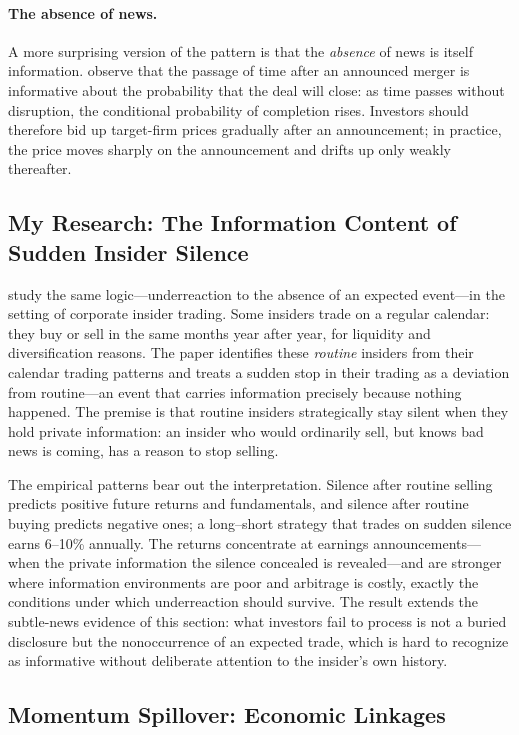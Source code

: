 \paragraph{The absence of news.} A more surprising version of the pattern is that the \emph{absence} of news is itself information. \citet{giglio2014} observe that the passage of time after an announced merger is informative about the probability that the deal will close: as time passes without disruption, the conditional probability of completion rises. Investors should therefore bid up target-firm prices gradually after an announcement; in practice, the price moves sharply on the announcement and drifts up only weakly thereafter.

\subsection{My Research: The Information Content of Sudden Insider Silence}

\citet{hongli2019} study the same logic---underreaction to the absence of an expected event---in the setting of corporate insider trading. Some insiders trade on a regular calendar: they buy or sell in the same months year after year, for liquidity and diversification reasons. The paper identifies these \emph{routine} insiders from their calendar trading patterns and treats a sudden stop in their trading as a deviation from routine---an event that carries information precisely because nothing happened. The premise is that routine insiders strategically stay silent when they hold private information: an insider who would ordinarily sell, but knows bad news is coming, has a reason to stop selling.

The empirical patterns bear out the interpretation. Silence after routine selling predicts positive future returns and fundamentals, and silence after routine buying predicts negative ones; a long--short strategy that trades on sudden silence earns 6--10\% annually. The returns concentrate at earnings announcements---when the private information the silence concealed is revealed---and are stronger where information environments are poor and arbitrage is costly, exactly the conditions under which underreaction should survive. The result extends the subtle-news evidence of this section: what investors fail to process is not a buried disclosure but the nonoccurrence of an expected trade, which is hard to recognize as informative without deliberate attention to the insider's own history.

\subsection{Momentum Spillover: Economic Linkages}

